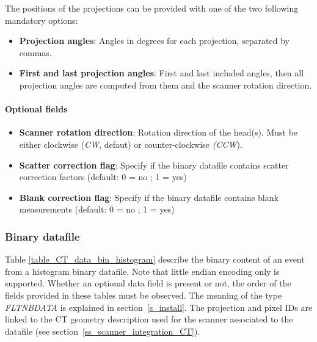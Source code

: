\documentclass[a4paper, 11pt]{article}
\begin{document}
The positions of the projections can be provided with one of the two following mandatory options:

\begin{itemize}
  \item \textbf{Projection angles}: Angles in degrees for each projection, separated by commas.
  \item \textbf{First and last projection angles}: First and last included angles, then all projection angles are computed from them and the scanner rotation direction.
\end{itemize}

\paragraph{Optional fields}
\begin{itemize}
  \item \textbf{Scanner rotation direction}: Rotation direction of the head(s). Must be either clockwise (\textit{CW}, defaut) or counter-clockwise \textit{(CCW}).
  \item \textbf{Scatter correction flag}: Specify if the binary datafile contains scatter correction factors (default: 0 = no ; 1 = yes)
  \item \textbf{Blank correction flag}: Specify if the binary datafile contains blank measurements (default: 0 = no ; 1 = yes)
\end{itemize}

\subsubsection{Binary datafile}

Table \ref{table_CT_data_bin_histogram} describe the binary content of an event from a histogram binary datafile.
Note that little endian encoding only is supported. Whether an optional data field is present or not, the order of
the fields provided in these tables must be observed. The meaning of the type \textit{FLTNBDATA} is explained in section~\ref{s_install}. The projection and
pixel IDs are linked to the CT geometry description used for the scanner associated to the datafile (see section~\ref{ss_scanner_integration_CT}).
\end{document}
